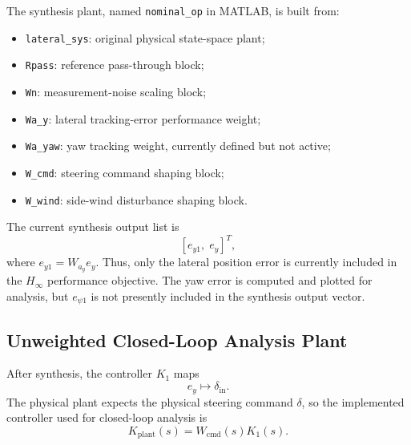 \documentclass[10pt,twocolumn]{article}
\begin{document}
The synthesis plant, named \texttt{nominal\_op} in MATLAB, is built from:
\begin{itemize}
    \item \texttt{lateral\_sys}: original physical state-space plant;
    \item \texttt{Rpass}: reference pass-through block;
    \item \texttt{Wn}: measurement-noise scaling block;
    \item \texttt{Wa\_y}: lateral tracking-error performance weight;
    \item \texttt{Wa\_yaw}: yaw tracking weight, currently defined but not active;
    \item \texttt{W\_cmd}: steering command shaping block;
    \item \texttt{W\_wind}: side-wind disturbance shaping block.
\end{itemize}

The current synthesis output list is
\begin{equation}
    \left[
        e_{y1},\; e_y
    \right]^T,
\end{equation}
where $e_{y1}=W_{a_y}e_y$. Thus, only the lateral position error is currently
included in the $H_\infty$ performance objective. The yaw error is computed and
plotted for analysis, but $e_{\psi 1}$ is not presently included in the
synthesis output vector.

\subsection{Unweighted Closed-Loop Analysis Plant}

After synthesis, the controller $K_1$ maps
\begin{equation}
    e_y \mapsto \delta_{\mathrm{in}}.
\end{equation}
The physical plant expects the physical steering command $\delta$, so the
implemented controller used for closed-loop analysis is
\begin{equation}
    K_{\mathrm{plant}}(s) = W_{\mathrm{cmd}}(s)K_1(s).
\end{equation}
\end{document}

